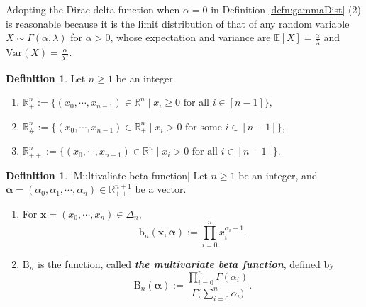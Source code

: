 \documentclass[12pt, a4paper]{amsart}
\theoremstyle{plain}
\theoremstyle{definition}
\newtheorem{defn}[thm]{Definition}
\numberwithin{figure}{section}
\numberwithin{table}{section}
\newcommand{\var}{\mathrm{Var}}
\newcommand{\newword}[1]{\textbf{\textit{#1}}}
\numberwithin{equation}{section}
\begin{document}
Adopting the Dirac delta function when 
$\alpha = 0$
in Definition \ref{defn:gammaDist} (2)
is reasonable because
it is the limit distribution of
that of
any random variable
$
X \sim
\Gamma(\alpha, \lambda)
$
for
$\alpha > 0$,
whose expectation and variance are
$
\mathbb{E}[X]
	=
\frac{\alpha}{\lambda}
$
and
$
\var(X)
	=
\frac{\alpha}{\lambda^2}
$.



\begin{defn}%
\label{defn:manyRs}
Let
$
n \ge 1
$
be an integer.
\begin{enumerate}
\item
$
\mathbb{R}_+^n
	:=
\{
	(x_0, \cdots, x_{n-1})
		\in
	\mathbb{R}^n
\mid
	x_i \ge 0
	\textrm{ for all $i \in [n-1]$}
\} ,
$

\item
$
\mathbb{R}_{\#}^n
	:=
\{
	(x_0, \cdots, x_{n-1})
		\in
	\mathbb{R}_+^n
\mid
	x_i > 0
	\textrm{ for some $i \in [n-1]$}
\} ,
$

\item
$
\mathbb{R}_{++}^n
	:=
\{
	(x_0, \cdots, x_{n-1})
		\in
	\mathbb{R}^n
\mid
	x_i > 0
	\textrm{ for all $i \in [n-1]$}
\} .
$
\end{enumerate}
\end{defn}


\begin{defn}{[Multivaliate beta function]}
\label{defn:multiBetaFunc}
Let 
$n \ge 1$
be an integer,
and
$
\boldsymbol{\alpha}
	=
(\alpha_0, \alpha_1, \cdots, \alpha_n) 
	\in
\mathbb{R}_{++}^{n+1}
$
be a vector.
\begin{enumerate}
  \item
For
$
\mathbf{x}
	=
(x_0, \cdots, x_n)
	\in
\Delta_n
$,
\begin{equation}
\label{eq:funcPiN}
\mathrm{b}_n(
	\mathbf{x}, 
	\boldsymbol{\alpha}
)
	:=
\prod_{i=0}^{n}
	x_i^{\alpha_i -1} .
\end{equation}

\item
$
\mathrm{B}_n
$
is the function, called \newword{the multivariate beta function}, 
defined by
\begin{equation}
\label{eq:multiBetaFun}
\mathrm{B}_n(
	\boldsymbol{\alpha}
)
	:=
\frac{
	\prod_{i=0}^{n}
		\Gamma(\alpha_i)
}{
	\Gamma\Big(
		\sum_{i=0}^n
			\alpha_i
	\Big)
}.
\end{equation}

\end{enumerate}
\end{defn}
\end{document}
